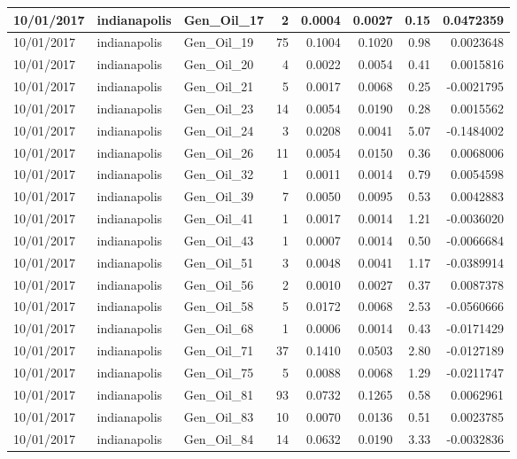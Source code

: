 \documentclass[
  letterpaper,
  DIV=11,
  numbers=noendperiod]{scrartcl}
\begin{document}
\begin{tabular}{l|l|l|r|r|r|r|r}
\hline
10/01/2017 & indianapolis & Gen\_Oil\_17 & 2 & 0.0004 & 0.0027 & 0.15 & 0.0472359\\
\hline
10/01/2017 & indianapolis & Gen\_Oil\_19 & 75 & 0.1004 & 0.1020 & 0.98 & 0.0023648\\
\hline
10/01/2017 & indianapolis & Gen\_Oil\_20 & 4 & 0.0022 & 0.0054 & 0.41 & 0.0015816\\
\hline
10/01/2017 & indianapolis & Gen\_Oil\_21 & 5 & 0.0017 & 0.0068 & 0.25 & -0.0021795\\
\hline
10/01/2017 & indianapolis & Gen\_Oil\_23 & 14 & 0.0054 & 0.0190 & 0.28 & 0.0015562\\
\hline
10/01/2017 & indianapolis & Gen\_Oil\_24 & 3 & 0.0208 & 0.0041 & 5.07 & -0.1484002\\
\hline
10/01/2017 & indianapolis & Gen\_Oil\_26 & 11 & 0.0054 & 0.0150 & 0.36 & 0.0068006\\
\hline
10/01/2017 & indianapolis & Gen\_Oil\_32 & 1 & 0.0011 & 0.0014 & 0.79 & 0.0054598\\
\hline
10/01/2017 & indianapolis & Gen\_Oil\_39 & 7 & 0.0050 & 0.0095 & 0.53 & 0.0042883\\
\hline
10/01/2017 & indianapolis & Gen\_Oil\_41 & 1 & 0.0017 & 0.0014 & 1.21 & -0.0036020\\
\hline
10/01/2017 & indianapolis & Gen\_Oil\_43 & 1 & 0.0007 & 0.0014 & 0.50 & -0.0066684\\
\hline
10/01/2017 & indianapolis & Gen\_Oil\_51 & 3 & 0.0048 & 0.0041 & 1.17 & -0.0389914\\
\hline
10/01/2017 & indianapolis & Gen\_Oil\_56 & 2 & 0.0010 & 0.0027 & 0.37 & 0.0087378\\
\hline
10/01/2017 & indianapolis & Gen\_Oil\_58 & 5 & 0.0172 & 0.0068 & 2.53 & -0.0560666\\
\hline
10/01/2017 & indianapolis & Gen\_Oil\_68 & 1 & 0.0006 & 0.0014 & 0.43 & -0.0171429\\
\hline
10/01/2017 & indianapolis & Gen\_Oil\_71 & 37 & 0.1410 & 0.0503 & 2.80 & -0.0127189\\
\hline
10/01/2017 & indianapolis & Gen\_Oil\_75 & 5 & 0.0088 & 0.0068 & 1.29 & -0.0211747\\
\hline
10/01/2017 & indianapolis & Gen\_Oil\_81 & 93 & 0.0732 & 0.1265 & 0.58 & 0.0062961\\
\hline
10/01/2017 & indianapolis & Gen\_Oil\_83 & 10 & 0.0070 & 0.0136 & 0.51 & 0.0023785\\
\hline
10/01/2017 & indianapolis & Gen\_Oil\_84 & 14 & 0.0632 & 0.0190 & 3.33 & -0.0032836\\

\end{tabular}
\end{document}
